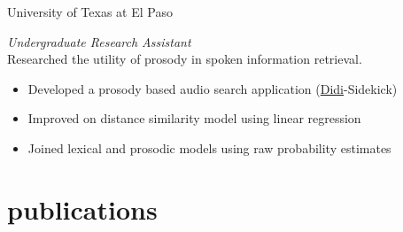 \documentclass[]{friggeri-cv} %
\begin{document}
\begin{entrylist}
{University of Texas at El Paso}
{\emph{Undergraduate Research Assistant} \\
Researched the utility of prosody in spoken information retrieval.
\begin{itemize}
\item %
Developed a prosody based audio search application (\href{http://www.cs.utep.edu/nigel/didi/}{Didi}-Sidekick)
\end{itemize}
\begin{itemize}
\item Improved on distance similarity model using linear regression
\end{itemize}
\begin{itemize}
\item Joined lexical and prosodic models using raw probability estimates
\end{itemize}}
\end{entrylist}


\section{publications}
\end{document}
